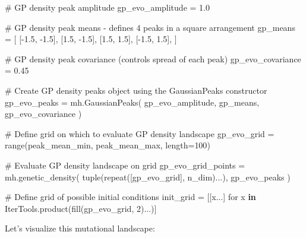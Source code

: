 \documentclass[
]{scrartcl}
\newenvironment{Shaded}{\begin{snugshade}}{\end{snugshade}}
\newcommand{\CommentTok}[1]{\textcolor[rgb]{0.37,0.37,0.37}{#1}}
\newcommand{\FloatTok}[1]{\textcolor[rgb]{0.68,0.00,0.00}{#1}}
\newcommand{\FunctionTok}[1]{\textcolor[rgb]{0.28,0.35,0.67}{#1}}
\newcommand{\KeywordTok}[1]{\textcolor[rgb]{0.00,0.23,0.31}{\textbf{#1}}}
\newcommand{\NormalTok}[1]{\textcolor[rgb]{0.00,0.23,0.31}{#1}}
\newcommand{\OperatorTok}[1]{\textcolor[rgb]{0.37,0.37,0.37}{#1}}
\begin{document}
\begin{Shaded}
\begin{Highlighting}[]
\CommentTok{\# GP density peak amplitude}
\NormalTok{gp\_evo\_amplitude }\OperatorTok{=} \FloatTok{1.0}

\CommentTok{\# GP density peak means {-} defines 4 peaks in a square arrangement}
\NormalTok{gp\_means }\OperatorTok{=}\NormalTok{ [}
\NormalTok{    [}\OperatorTok{{-}}\FloatTok{1.5}\NormalTok{, }\OperatorTok{{-}}\FloatTok{1.5}\NormalTok{],}
\NormalTok{    [}\FloatTok{1.5}\NormalTok{, }\OperatorTok{{-}}\FloatTok{1.5}\NormalTok{],}
\NormalTok{    [}\FloatTok{1.5}\NormalTok{, }\FloatTok{1.5}\NormalTok{],}
\NormalTok{    [}\OperatorTok{{-}}\FloatTok{1.5}\NormalTok{, }\FloatTok{1.5}\NormalTok{],}
\NormalTok{]}

\CommentTok{\# GP density peak covariance (controls spread of each peak)}
\NormalTok{gp\_evo\_covariance }\OperatorTok{=} \FloatTok{0.45}

\CommentTok{\# Create GP density peaks object using the \textasciigrave{}GaussianPeaks\textasciigrave{} constructor}
\NormalTok{gp\_evo\_peaks }\OperatorTok{=}\NormalTok{ mh.}\FunctionTok{GaussianPeaks}\NormalTok{(}
\NormalTok{    gp\_evo\_amplitude,}
\NormalTok{    gp\_means,}
\NormalTok{    gp\_evo\_covariance}
\NormalTok{)}

\CommentTok{\# Define grid on which to evaluate GP density landscape}
\NormalTok{gp\_evo\_grid }\OperatorTok{=} \FunctionTok{range}\NormalTok{(peak\_mean\_min, peak\_mean\_max, length}\OperatorTok{=}\FloatTok{100}\NormalTok{)}

\CommentTok{\# Evaluate GP density landscape on grid}
\NormalTok{gp\_evo\_grid\_points }\OperatorTok{=}\NormalTok{ mh.}\FunctionTok{genetic\_density}\NormalTok{(}
    \FunctionTok{tuple}\NormalTok{(}\FunctionTok{repeat}\NormalTok{([gp\_evo\_grid], n\_dim)}\OperatorTok{...}\NormalTok{),}
\NormalTok{    gp\_evo\_peaks}
\NormalTok{)}

\CommentTok{\# Define grid of possible initial conditions}
\NormalTok{init\_grid }\OperatorTok{=}\NormalTok{ [[x}\OperatorTok{...}\NormalTok{] for x }\KeywordTok{in}\NormalTok{ IterTools.}\FunctionTok{product}\NormalTok{(}\FunctionTok{fill}\NormalTok{(gp\_evo\_grid, }\FloatTok{2}\NormalTok{)}\OperatorTok{...}\NormalTok{)]}
\end{Highlighting}
\end{Shaded}

Let's visualize this mutational landscape:
\end{document}

